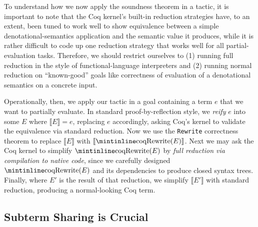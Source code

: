 To understand how we now apply the soundness theorem in a tactic, it is important to note that the Coq kernel's built-in reduction strategies have, to an extent, been tuned to work well to show equivalence between a simple denotational-semantics application and the semantic value it produces, while it is rather difficult to code up one reduction strategy that works well for all partial-evaluation tasks.
Therefore, we should restrict ourselves to (1) running full reduction in the style of functional-language interpreters and (2) running normal reduction on ``known-good'' goals like correctness of evaluation of a denotational semantics on a concrete input.

Operationally, then, we apply our tactic in a goal containing a term $e$ that we want to partially evaluate.
In standard proof-by-reflection style, we \emph{reify} $e$ into some $E$ where $\llbracket E \rrbracket = e$, replacing $e$ accordingly, asking Coq's kernel to validate the equivalence via standard reduction.
Now we use the \texttt{Rewrite} correctness theorem to replace $\llbracket E \rrbracket$ with $\llbracket \textmintinline{coq}{Rewrite}(E) \rrbracket$.
Next we may ask the Coq kernel to simplify $\textmintinline{coq}{Rewrite}(E)$ by \emph{full reduction via compilation to native code}, since we carefully designed $\textmintinline{coq}{Rewrite}(E)$ and its dependencies to produce closed syntax trees.
Finally, where $E'$ is the result of that reduction, we simplify $\llbracket E' \rrbracket$ with standard reduction, producing a normal-looking Coq term.


\subsection{Subterm Sharing is Crucial} \label{sec:under-lets}

